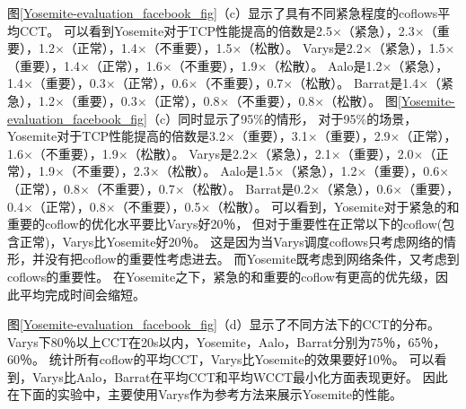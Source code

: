 图\ref{Yosemite-evaluation_facebook_fig}（c）显示了具有不同紧急程度的coflows平均CCT。
可以看到Yosemite对于TCP性能提高的倍数是2.5$\times$（紧急），2.3$\times$（重要），1.2$\times$（正常），1.4$\times$（不重要），1.5$\times$（松散）。
Varys是2.2$\times$（紧急），1.5$\times$（重要），1.4$\times$（正常），1.6$\times$（不重要），1.9$\times$（松散）。
Aalo是1.2$\times$（紧急），1.4$\times$（重要），0.3$\times$（正常），0.6$\times$（不重要），0.7$\times$（松散）。
Barrat是1.4$\times$（紧急），1.2$\times$（重要），0.3$\times$（正常），0.8$\times$（不重要），0.8$\times$（松散）。
图\ref{Yosemite-evaluation_facebook_fig}（c）同时显示了95$\%$的情形，
对于95$\%$的场景，Yosemite对于TCP性能提高的倍数是3.2$\times$（重要），3.1$\times$（重要），2.9$\times$（正常），1.6$\times$（不重要），1.9$\times$（松散）。
Varys是2.2$\times$（紧急），2.1$\times$（重要），2.0$\times$（正常），1.9$\times$（不重要），2.3$\times$（松散）。
Aalo是1.5$\times$（紧急），1.2$\times$（重要），0.6$\times$（正常），0.8$\times$（不重要），0.7$\times$（松散）。
Barrat是0.2$\times$（紧急），0.6$\times$（重要），0.4$\times$（正常），0.8$\times$（不重要），0.5$\times$（松散）。
可以看到，Yosemite对于紧急的和重要的coflow的优化水平要比Varys好20％，
但对于重要性在正常以下的coflow(包含正常)，Varys比Yosemite好20％。
这是因为当Varys调度coflows只考虑网络的情形，并没有把coflow的重要性考虑进去。
而Yosemite既考虑到网络条件，又考虑到coflows的重要性。
在Yosemite之下，紧急的和重要的coflow有更高的优先级，因此平均完成时间会缩短。

图\ref{Yosemite-evaluation_facebook_fig}（d）显示了不同方法下的CCT的分布。
Varys下80％以上CCT在20s以内，Yosemite，Aalo，Barrat分别为75％，65％，60％。
统计所有coflow的平均CCT，Varys比Yosemite的效果要好10％。
可以看到，Varys比Aalo，Barrat在平均CCT和平均WCCT最小化方面表现更好。
因此在下面的实验中，主要使用Varys作为参考方法来展示Yosemite的性能。


